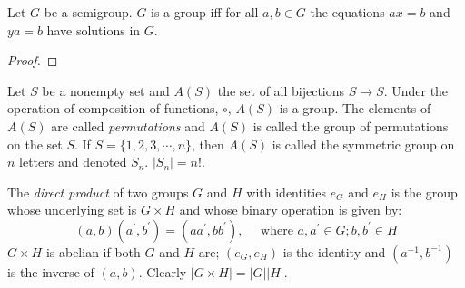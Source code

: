 \begin{Proposition}
	Let $ G $ be a semigroup. $ G $ is a group iff for all $ a,b\in G $ the equations $ ax=b $ and $ ya=b $ have solutions in $ G $.
\end{Proposition}
\begin{proof}
	\exercise
\end{proof}

\begin{Example}
	Let $ S $ be a nonempty set and $ A(S) $ the set of all bijections $ S \to S $. Under the operation of composition of functions, $ \circ $, $ A(S) $ is a group. The elements of $ A(S) $ are called \textit{permutations} and $ A(S) $ is called the group of permutations on the set $ S $. If $ S=\{1,2,3,\cdots,n\} $, then $ A(S) $ is called the symmetric group on $ n $ letters and denoted $ S_n $. $ |S_n|=n! $.
\end{Example}
\begin{definition}
	The \textit{direct product} of two groups $ G $ and $ H $ with identities $ e_G $ and $ e_H $ is the group whose underlying set is $ G \times H $ and whose binary operation is given by:
	\begin{equation}
		(a,b)(a^\prime,b^\prime)=(a a^\prime,b b^\prime),\quad \text{ where }a,a^\prime \in G;b, b^\prime \in H\nonumber
	\end{equation}
	$ G \times H $ is abelian if both $ G $ and $ H $ are; $ (e_G,e_H) $ is the identity and $ (a^{-1},b^{-1}) $ is the inverse of $ (a,b) $. Clearly $ |G \times H|=|G||H| $.
\end{definition}


